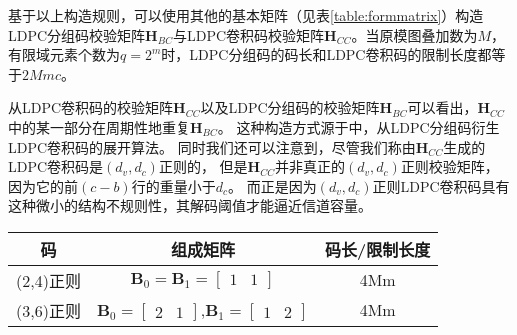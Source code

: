 基于以上构造规则，可以使用其他的基本矩阵（见表\ref{table:formmatrix}）构造LDPC分组码校验矩阵$\mathbf{H}_{BC}$与LDPC卷积码校验矩阵$\mathbf{H}_{CC}$。当原模图叠加数为$M$，有限域元素个数为$q=2^m$时，LDPC分组码的码长和LDPC卷积码的限制长度都等于$2Mmc$。

从LDPC卷积码的校验矩阵$\mathbf{H}_{CC}$以及LDPC分组码的校验矩阵$\mathbf{H}_{BC}$可以看出，$\mathbf{H}_{CC}$中的某一部分在周期性地重复$\mathbf{H}_{BC}$。
这种构造方式源于\parencite{782171}中，从LDPC分组码衍生LDPC卷积码的展开算法。
同时我们还可以注意到，尽管我们称由$\mathbf{H}_{CC}$生成的LDPC卷积码是$(d_v,d_c)$正则的，
但是$\mathbf{H}_{CC}$并非真正的$(d_v,d_c)$正则校验矩阵，因为它的前$(c-b)$行的重量小于$d_c$。
而正是因为$(d_v,d_c)$正则LDPC卷积码具有这种微小的结构不规则性，其解码阈值才能逼近信道容量。
\begin{center}
\label{table:formmatrix}
\begin{tabular}{c|c|c}
 \hline
码 & 组成矩阵 &码长/限制长度 \\ \hline
(2,4)正则 & 
$\mathbf{B}_0 = \mathbf{B}_1 = [\begin{array}{cc} 1&1 \end{array}]$ & 4Mm \\ \hline
(3,6)正则 & 
 $\mathbf{B}_0 = [\begin{array}{cc} 2&1 \end{array}]$,$\mathbf{B}_1 = [\begin{array}{cc} 1&2 \end{array}]$ & 4Mm \\ \hline
\end{tabular}
\end{center}